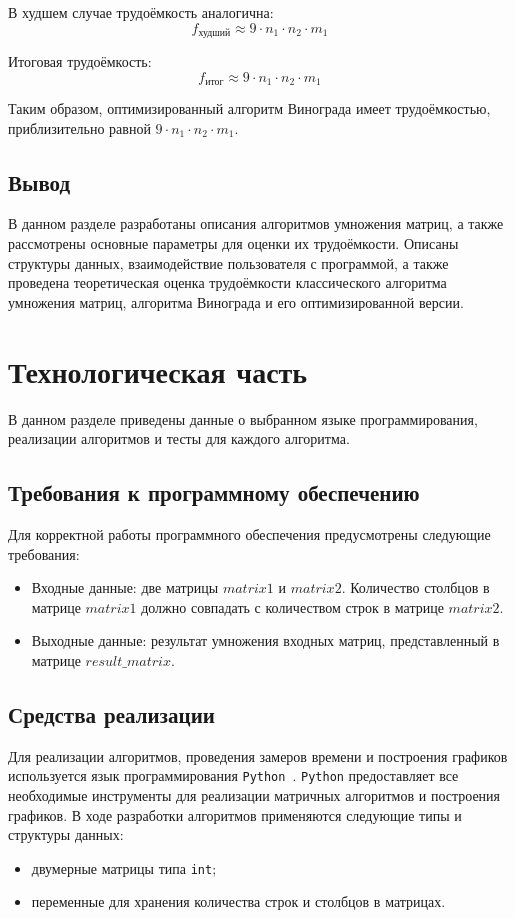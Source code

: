 \documentclass[a4paper, 12pt]{extreport}
\begin{document}
В худшем случае трудоёмкость аналогична:
\begin{equation}
f_{\text{худший}} \approx 9 \cdot n_1 \cdot n_2 \cdot m_1
\end{equation}

Итоговая трудоёмкость:
\begin{equation}
f_{\text{итог}} \approx 9 \cdot n_1 \cdot n_2 \cdot m_1
\end{equation}

Таким образом, оптимизированный алгоритм Винограда имеет трудоёмкостью, приблизительно равной $9 \cdot n_1 \cdot n_2 \cdot m_1$.

\section*{Вывод}
В данном разделе разработаны описания алгоритмов умножения матриц, а также рассмотрены основные параметры для оценки их трудоёмкости. Описаны структуры данных, взаимодействие пользователя с программой, а также проведена теоретическая оценка трудоёмкости классического алгоритма умножения матриц, алгоритма Винограда и его оптимизированной версии.


\chapter{Технологическая часть}
В данном разделе приведены данные о выбранном языке программирования, реализации алгоритмов и тесты для каждого алгоритма.

\section{Требования к программному обеспечению}
Для корректной работы программного обеспечения предусмотрены следующие требования:
\begin{itemize}
    \item[--] Входные данные: две матрицы $matrix1$ и $matrix2$. Количество столбцов в матрице $matrix1$ должно совпадать с количеством строк в матрице $matrix2$.
    \item[--] Выходные данные: результат умножения входных матриц, представленный в матрице $result\_matrix$.
\end{itemize}

\section{Средства реализации}
Для реализации алгоритмов, проведения замеров времени и построения графиков используется язык программирования \texttt{Python}~\cite{bib3}. \texttt{Python} предоставляет все необходимые инструменты для реализации матричных алгоритмов и построения графиков. В ходе разработки алгоритмов применяются следующие типы и структуры данных:
\begin{itemize} 
    \item[--] двумерные матрицы типа \texttt{int}; 
    \item[--] переменные для хранения количества строк и столбцов в матрицах. 
\end{itemize}
\end{document}
